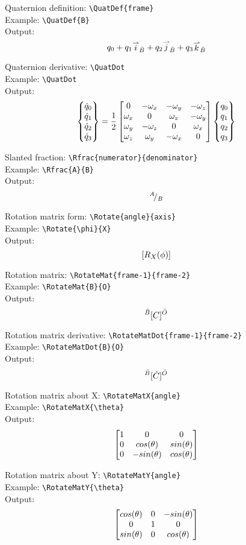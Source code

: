 \documentclass{article}
\begin{document}
\noindent
Quaternion definition: \verb|\QuatDef{frame}|\\
Example: \verb|\QuatDef{B}|\\
Output:
\begin{equation*}
    \QuatDef{B}
\end{equation*} 

\noindent
Quaternion derivative: \verb|\QuatDot|\\
Example: \verb|\QuatDot|\\
Output:
\begin{equation*}
      \begin{Bmatrix} {\dot{q}_0} \\ {\dot{q}_1} \\ {\dot{q}_2} \\ {\dot{q}_3} \end{Bmatrix}  = \frac{1}{2} \begin{bmatrix} 0 & -\omega_x & -\omega_y & -\omega_z \\ \omega_x & 0 & \omega_z & -\omega_y \\ \omega_y & -\omega_z & 0 & \omega_x \\ \omega_z & \omega_y & -\omega_x & 0 \end{bmatrix}  \begin{Bmatrix} {q_0} \\ {q_1} \\ {q_2} \\ {q_3} \end{Bmatrix}  
\end{equation*} 

\noindent
Slanted fraction: \verb|\Rfrac{numerator}{denominator}|\\
Example: \verb|\Rfrac{A}{B}|\\
Output:
\begin{equation*}
    {}^{A}\!/_{B}
\end{equation*} 

\noindent
Rotation matrix form: \verb|\Rotate{angle}{axis}|\\
Example: \verb|\Rotate{\phi}{X}|\\
Output:
\begin{equation*}
    [R_{{X}}({\phi})]
\end{equation*} 

\noindent
Rotation matrix: \verb|\RotateMat{frame-1}{frame-2}|\\
Example: \verb|\RotateMat{B}{O}|\\
Output:
\begin{equation*}
     {}^{\bar{B}}\lbrack{C}\rbrack^{\bar{O}}
\end{equation*} 

\noindent
Rotation matrix derivative: \verb|\RotateMatDot{frame-1}{frame-2}|\\
Example: \verb|\RotateMatDot{B}{O}|\\
Output:
\begin{equation*}
     {}^{\bar{B}}\lbrack{\dot{C}}\rbrack^{\bar{O}}
\end{equation*} 

\noindent
Rotation matrix about X: \verb|\RotateMatX{angle}|\\
Example: \verb|\RotateMatX{\theta}|\\
Output:
\begin{equation*}
     \begin{bmatrix} 1 & 0 & 0 \\ 0 & cos(\theta) & sin(\theta) \\ 0 & -sin(\theta) & cos(\theta) \end{bmatrix} 
\end{equation*} 

\noindent
Rotation matrix about Y: \verb|\RotateMatY{angle}|\\
Example: \verb|\RotateMatY{\theta}|\\
Output:
\begin{equation*}
     \begin{bmatrix} cos(\theta) & 0 & -sin(\theta) \\ 0 & 1 & 0 \\ sin(\theta) & 0& cos(\theta) \end{bmatrix} 
\end{equation*} 
\end{document}
